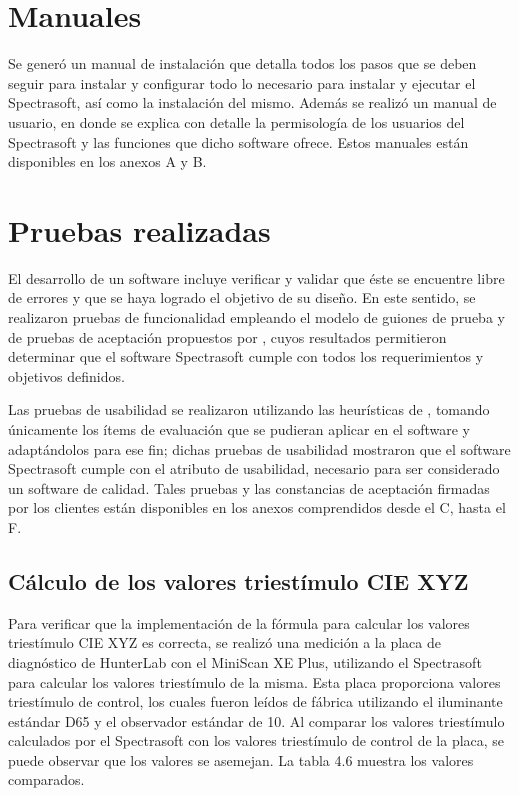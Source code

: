\newpage
\section{Manuales}
	Se gener\'{o} un manual de instalaci\'{o}n que detalla todos los pasos que se deben seguir para instalar y configurar todo lo necesario para instalar y ejecutar el Spectrasoft, as\'{i} como la instalaci\'{o}n del mismo. Adem\'{a}s se realiz\'{o} un manual de usuario, en donde se explica con detalle la permisolog\'{i}a de los usuarios del Spectrasoft y las funciones que dicho software ofrece. Estos manuales est\'{a}n disponibles en los anexos A y B.

\section{Pruebas realizadas}
	
	El desarrollo de un software incluye verificar y validar que \'{e}ste se encuentre libre de errores y que se haya logrado el objetivo de su dise\~{n}o. En este sentido, se realizaron pruebas de funcionalidad empleando el modelo de guiones de prueba y de pruebas de aceptaci\'{o}n propuestos por , cuyos resultados permitieron determinar que el software Spectrasoft cumple con todos los requerimientos y objetivos definidos.
	
	Las pruebas de usabilidad se realizaron utilizando las heur\'{i}sticas de , tomando \'{u}nicamente los \'{i}tems de evaluaci\'{o}n que se pudieran aplicar en el software y adapt\'{a}ndolos para ese fin; dichas pruebas de usabilidad mostraron que el software Spectrasoft cumple con el atributo de usabilidad, necesario para ser considerado un software de calidad. Tales pruebas y las constancias de aceptaci\'{o}n firmadas por los clientes est\'{a}n disponibles en los anexos comprendidos desde el C, hasta el F.
	
	\subsection{C\'{a}lculo de los valores triest\'{i}mulo CIE XYZ}
	Para verificar que la implementaci\'{o}n de la f\'{o}rmula para calcular los valores triest\'{i}mulo CIE XYZ	es correcta, se realiz\'{o} una medici\'{o}n a la placa de diagn\'{o}stico de HunterLab con el MiniScan XE Plus, utilizando el Spectrasoft para calcular los valores triest\'{i}mulo de la misma. Esta placa proporciona valores triest\'{i}mulo de control, los cuales fueron le\'{i}dos de f\'{a}brica utilizando el iluminante est\'{a}ndar D65 y el observador est\'{a}ndar de 10\degree. Al comparar los valores triest\'{i}mulo calculados por el Spectrasoft con los valores triest\'{i}mulo de control de la placa, se puede observar que los valores se asemejan. La tabla 4.6 muestra los valores comparados.
	
